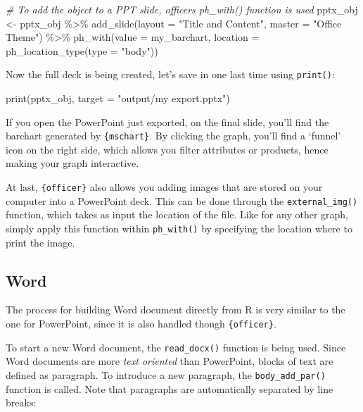 \documentclass[
]{krantz}
\makeatletter
\newenvironment{Shaded}{\begin{snugshade}}{\end{snugshade}}
\newcommand{\AttributeTok}[1]{\textcolor[rgb]{0.61,0.61,0.61}{#1}}
\newcommand{\CommentTok}[1]{\textcolor[rgb]{0.37,0.37,0.37}{\textit{#1}}}
\newcommand{\FunctionTok}[1]{\textcolor[rgb]{0,0,0}{#1}}
\newcommand{\NormalTok}[1]{#1}
\newcommand{\OtherTok}[1]{\textcolor[rgb]{0.37,0.37,0.37}{#1}}
\newcommand{\SpecialCharTok}[1]{\textcolor[rgb]{0,0,0}{#1}}
\newcommand{\StringTok}[1]{\textcolor[rgb]{0.5,0.5,0.5}{#1}}
\newenvironment{kframe}{%
\medskip{}
\setlength{\fboxsep}{.8em}
 \def\at@end@of@kframe{}%
 \ifinner\ifhmode%
  \def\at@end@of@kframe{\end{minipage}}%
  \begin{minipage}{\columnwidth}%
 \fi\fi%
 \def\FrameCommand##1{\hskip\@totalleftmargin \hskip-\fboxsep
 \colorbox{shadecolor}{##1}\hskip-\fboxsep
     \hskip-\linewidth \hskip-\@totalleftmargin \hskip\columnwidth}%
 \MakeFramed {\advance\hsize-\width
   \@totalleftmargin\z@ \linewidth\hsize
   \@setminipage}}%
 {\par\unskip\endMakeFramed%
 \at@end@of@kframe}
\renewenvironment{Shaded}{\begin{kframe}}{\end{kframe}}
\makeatother
\begin{document}
\begin{Shaded}
\begin{Highlighting}[]
\CommentTok{\# To add the object to a PPT slide, officer\textquotesingle{}s ph\_with() function is used}
\NormalTok{pptx\_obj }\OtherTok{\textless{}{-}}\NormalTok{ pptx\_obj }\SpecialCharTok{\%\textgreater{}\%}
  \FunctionTok{add\_slide}\NormalTok{(}\AttributeTok{layout =} \StringTok{"Title and Content"}\NormalTok{, }\AttributeTok{master =} \StringTok{"Office Theme"}\NormalTok{) }\SpecialCharTok{\%\textgreater{}\%}
  \FunctionTok{ph\_with}\NormalTok{(}\AttributeTok{value =}\NormalTok{ my\_barchart, }
          \AttributeTok{location =} \FunctionTok{ph\_location\_type}\NormalTok{(}\AttributeTok{type =} \StringTok{"body"}\NormalTok{))}
\end{Highlighting}
\end{Shaded}

Now the full deck is being created, let's save in one last time using \texttt{print()}:

\begin{Shaded}
\begin{Highlighting}[]
\FunctionTok{print}\NormalTok{(pptx\_obj, }\AttributeTok{target =} \StringTok{"output/my export.pptx"}\NormalTok{)}
\end{Highlighting}
\end{Shaded}

If you open the PowerPoint just exported, on the final slide, you'll find the barchart generated by \texttt{\{mschart\}}. By clicking the graph, you'll find a `funnel' icon on the right side, which allows you filter attributes or products, hence making your graph interactive.

At last, \texttt{\{officer\}} also allows you adding images that are stored on your computer into a PowerPoint deck. This can be done through the \texttt{external\_img()} function, which takes as input the location of the file. Like for any other graph, simply apply this function within \texttt{ph\_with()} by specifying the location where to print the image.

\hypertarget{word}{%
\subsection{Word}\label{word}}

The process for building Word document directly from R is very similar to the one for PowerPoint, since it is also handled though \texttt{\{officer\}}.

To start a new Word document, the \texttt{read\_docx()} function is being used. Since Word documents are more \emph{text oriented} than PowerPoint, blocks of text are defined as paragraph. To introduce a new paragraph, the \texttt{body\_add\_par()} function is called. Note that paragraphs are automatically separated by line breaks:
\end{document}
